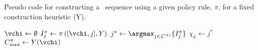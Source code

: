 \begin{algorithm}
    \caption{Pseudo code for constructing a \JSP\ sequence using a given policy 
    rule, $\pi$, for a fixed construction heuristic (Y).} 
    \label{pseudo:constructJSP}
    \begin{algorithmic}[1]
        \State $\vchi \gets \emptyset$  
        \State $I_j^{\pi} \leftarrow \pi \left([\vchi,j],Y\right)$ 
        \EndFor
        \State $j^* \gets \argmax_{j\in \mathcal{L}^{(k)}}\{I_j^{\pi}\}$ 
        \State $\chi_k \gets j^*$ 
        \EndFor
        \State \Return $C_{\max}^{\pi} \gets Y(\vchi)$ 
        \EndProcedure
    \end{algorithmic}
\end{algorithm}